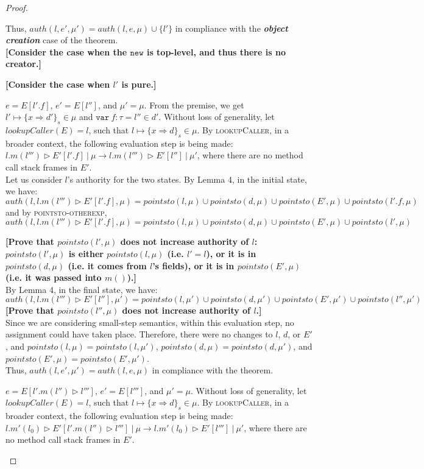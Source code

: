\documentclass{llncs}
\newcommand{\keywadj}[1]{\mathtt{#1}}
\newcommand{\keyw}[1]{\keywadj{#1}~}
\newcommand{\todo}[1]{\textbf{[#1]}}
\newcommand{\pcase}[1][]{
  \if\relax\detokenize{#1}\relax
    \def\thiscase{}
  \else
    \def\thiscase{~#1}
  \fi
  \item
}
\begin{document}
\begin{proof}
\begin{pcases}
Thus, $auth(l, e', \mu') = auth(l, e, \mu) \cup \{ l' \}$ in compliance with the \textbf{\textit{object creation}} case of the theorem.\\

\todo{Consider the case when the $\keywadj{new}$ is top-level, and thus there is no creator.}

\todo{Consider the case when $l'$ is pure.}
\\
\pcase[\textsc{E-Field}]
$e = E[l'.f]$, $e' = E[l'']$, and $\mu' = \mu$. From the premise, we get $l' \mapsto \{ x \Rightarrow d' \}_{s} \in \mu$ and $\keyw{var} f : \tau = l'' \in d'$. Without loss of generality, let $lookupCaller(E) = l$, such that $l \mapsto \{ x \Rightarrow d \}_{s} \in \mu$. By \textsc{lookupCaller}, in a broader context, the following evaluation step is being made: \mbox{$l.m(l''') \rhd E'[l'.f]~|~\mu \longrightarrow l.m(l''') \rhd E'[l'']~|~\mu'$}, where there are no method call stack frames in $E'$.\\

Let us consider $l$'s authority for the two states. By Lemma 4, in the initial state, we have:
\[
auth(l, l.m(l''') \rhd E'[l'.f], \mu) = pointsto(l, \mu) \cup pointsto(d, \mu) \cup pointsto(E', \mu) \cup pointsto(l'.f, \mu)
\]
and by \textsc{pointsto-otherexp},
\[
auth(l, l.m(l''') \rhd E'[l'.f], \mu) = pointsto(l, \mu) \cup pointsto(d, \mu) \cup pointsto(E', \mu) \cup pointsto(l', \mu)
\]

\todo{Prove that $pointsto(l', \mu)$ does not increase authority of $l$: $pointsto(l', \mu)$ is either $pointsto(l, \mu)$ (i.e. $l' = l$), or it is in $pointsto(d, \mu)$ (i.e. it comes from $l$'s fields), or it is in $pointsto(E', \mu)$ (i.e. it was passed into $m()$).}\\

By Lemma 4, in the final state, we have:
\[
auth(l, l.m(l''') \rhd E'[l''], \mu') = pointsto(l, \mu') \cup pointsto(d, \mu') \cup pointsto(E', \mu') \cup pointsto(l'', \mu')
\]
\todo{Prove that $pointsto(l'', \mu)$ does not increase authority of $l$.}\\

Since we are considering small-step semantics, within this evaluation step, no assignment could have taken place. Therefore, there were no changes to $l$, $d$, or $E'$, and $pointsto(l, \mu) = pointsto(l, \mu')$, $pointsto(d, \mu) = pointsto(d, \mu')$, and $pointsto(E', \mu) = pointsto(E', \mu')$.\\

Thus, $auth(l, e', \mu') = auth(l, e, \mu)$ in compliance with the theorem.
\\
\pcase[\textsc{E-StackFrame}]
$e = E[l'.m(l'') \rhd l''']$, $e' = E[l''']$, and $\mu' = \mu$. Without loss of generality, let $lookupCaller(E) = l$, such that $l \mapsto \{ x \Rightarrow d \}_{s} \in \mu$. By \textsc{lookupCaller}, in a broader context, the following evaluation step is being made: \mbox{$l.m'(l_0) \rhd E'[l'.m(l'') \rhd l''']~|~\mu \longrightarrow l.m'(l_0) \rhd E'[l''']~|~\mu'$}, where there are no method call stack frames in $E'$.\\


\end{pcases}
\end{proof}
\end{document}
